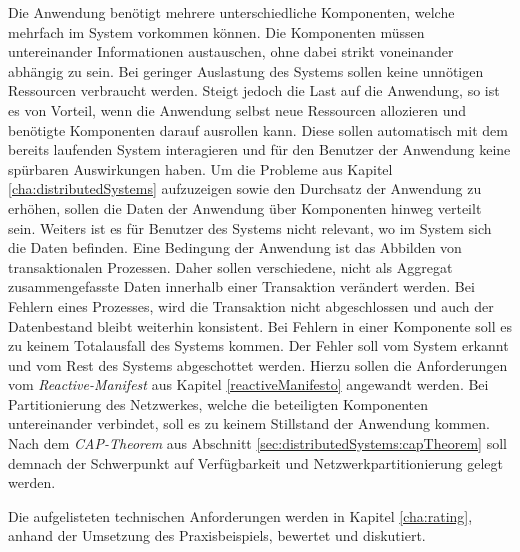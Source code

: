 \begin{enumerate}
  Die Anwendung benötigt mehrere unterschiedliche Komponenten, welche mehrfach im System vorkommen können. Die Komponenten müssen untereinander Informationen austauschen, ohne dabei strikt voneinander abhängig zu sein.
  Bei geringer Auslastung des Systems sollen keine unnötigen Ressourcen verbraucht werden. Steigt jedoch die Last auf die Anwendung, so ist es von Vorteil, wenn die Anwendung selbst neue Ressourcen allozieren und benötigte Komponenten darauf ausrollen kann. Diese sollen automatisch mit dem bereits laufenden System interagieren und für den Benutzer der Anwendung keine spürbaren Auswirkungen haben.
  Um die Probleme aus Kapitel \ref{cha:distributedSystems} aufzuzeigen sowie den Durchsatz der Anwendung zu erhöhen, sollen die Daten der Anwendung über Komponenten hinweg verteilt sein. Weiters ist es für Benutzer des Systems nicht relevant, wo im System sich die Daten befinden. 
  Eine Bedingung der Anwendung ist das Abbilden von transaktionalen Prozessen. Daher sollen verschiedene, nicht als Aggregat zusammengefasste Daten innerhalb einer Transaktion verändert werden. Bei Fehlern eines Prozesses, wird die Transaktion nicht abgeschlossen und auch der Datenbestand bleibt weiterhin konsistent.
  Bei Fehlern in einer Komponente soll es zu keinem Totalausfall des Systems kommen. Der Fehler soll vom System erkannt und vom Rest des Systems abgeschottet werden. Hierzu sollen die Anforderungen vom \textit{Reactive-Manifest} aus Kapitel \ref{reactiveManifesto} angewandt werden.
  Bei Partitionierung des Netzwerkes, welche die beteiligten Komponenten untereinander verbindet, soll es zu keinem Stillstand der Anwendung kommen. Nach dem \textit{CAP-Theorem} aus Abschnitt \ref{sec:distributedSystems:capTheorem} soll demnach der Schwerpunkt auf Verfügbarkeit und Netzwerkpartitionierung gelegt werden. 
\end{enumerate}
Die aufgelisteten technischen Anforderungen werden in Kapitel \ref{cha:rating}, anhand der Umsetzung des Praxisbeispiels, bewertet und diskutiert. 

